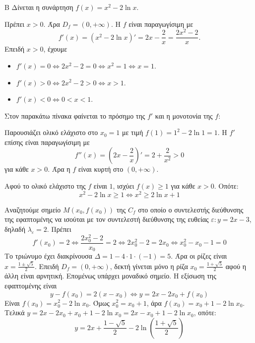 \begin{thema}{Β}
Δίνεται η συνάρτηση $f(x) = x^2 - 2\ln x$.

\begin{erwthma}
\item Πρέπει $x > 0$. Άρα $D_f = (0, +\infty)$. Η $f$ είναι παραγωγίσιμη με \[f'(x) =\left(x^2-2\ln{x}\right)'= 2x - \frac{2}{x} = \frac{2x^2-2}{x}.\]
Επειδή $x>0$, έχουμε 
\begin{itemize}
\item $f'(x) = 0 \Leftrightarrow 2x^2-2 = 0 \Leftrightarrow x^2 = 1 \Leftrightarrow x = 1$.
\item $f'(x) > 0 \Leftrightarrow 2x^2-2 > 0 \Leftrightarrow x > 1$.
\item $f'(x) < 0 \Leftrightarrow 0 < x < 1$.
\end{itemize}

Στον παρακάτω πίνακα φαίνεται το πρόσημο της $f'$ και η μονοτονία της $f$:
\begin{center}
\end{center}
Παρουσιάζει ολικό ελάχιστο στο $x_0 = 1$ με τιμή $f(1) = 1^2 - 2\ln 1 = 1$. Η $f'$ επίσης είναι παραγωγίσιμη με \[f''(x) =\left(2x-\frac{2}{x}\right)'= 2 + \frac{2}{x^2}>0\]
για κάθε $x > 0$. Άρα η $f$ είναι κυρτή στο $(0, +\infty)$.

\item Αφού το ολικό ελάχιστο της $f$ είναι $1$, ισχύει $f(x) \ge 1$ για κάθε $x > 0$.
Οπότε:
\[ x^2 - 2\ln x \ge 1 \Leftrightarrow x^2 \ge 2\ln x + 1 \]

\item Αναζητούμε σημείο $M(x_0, f(x_0))$ της $C_f$ στο οποίο ο συντελεστής διεύθυνσης της εφαπτομένης να ισούται με τον συντελεστή διεύθυνσης της ευθείας $\varepsilon: y=2x-3$, δηλαδή $\lambda_\varepsilon = 2$.
Πρέπει 
\[f'(x_0) = 2 \Leftrightarrow \frac{2x_0^2-2}{x_0} = 2 \Leftrightarrow 2x_0^2 - 2 = 2x_0 \Leftrightarrow x_0^2 - x_0 - 1 = 0\]
Το τριώνυμο έχει διακρίνουσα $\Delta = 1 - 4\cdot1\cdot(-1) = 5$. Άρα οι ρίζες είναι $x = \frac{1 \pm \sqrt{5}}{2}$.
Επειδή $D_f = (0, +\infty)$, δεκτή γίνεται μόνο η ρίζα $x_0 = \frac{1+\sqrt{5}}{2}$ αφού η άλλη είναι αρνητική. Επομένως υπάρχει μοναδικό σημείο.
Η εξίσωση της εφαπτομένης είναι \[y - f(x_0) = 2(x - x_0) \Leftrightarrow y = 2x - 2x_0 + f(x_0)\]
Είναι $f(x_0) = x_0^2 - 2\ln x_0$. Όμως $x_0^2 = x_0 + 1$, άρα $f(x_0) = x_0 + 1 - 2\ln x_0$.
Τελικά $y = 2x - 2x_0 + x_0 + 1 - 2\ln x_0 = 2x - x_0 + 1 - 2\ln x_0$, οπότε:
\[ y = 2x + \frac{1-\sqrt{5}}{2} - 2\ln\left( \frac{1+\sqrt{5}}{2} \right) \]


\end{erwthma}
\end{thema}
